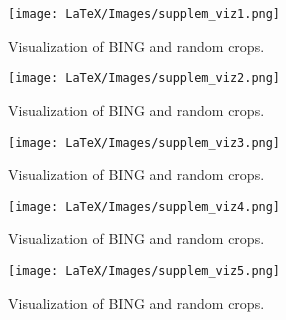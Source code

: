 \begin{figure*}[t!]

  \centering
   \centering
    \texttt{[image: LaTeX/Images/supplem\_viz1.png]}
   
    \caption{Visualization of BING and random crops. }
     \label{tab:viz_bing1}
\end{figure*}


\begin{figure*}[t!]

  \centering
   \centering
    \texttt{[image: LaTeX/Images/supplem\_viz2.png]}
   
    \caption{Visualization of BING and random crops.}
     \label{tab:viz_bing2}
\end{figure*}
\begin{figure*}[t!]

  \centering
   \centering
    \texttt{[image: LaTeX/Images/supplem\_viz3.png]}
   
    \caption{Visualization of BING and random crops.}
     \label{tab:viz_bing3}
\end{figure*}
\begin{figure*}[t!]

  \centering
   \centering
    \texttt{[image: LaTeX/Images/supplem\_viz4.png]}
   
    \caption{Visualization of BING and random crops.}
     \label{tab:viz_bing4}
\end{figure*}
\begin{figure*}[t!]

  \centering
   \centering
    \texttt{[image: LaTeX/Images/supplem\_viz5.png]}
   
    \caption{Visualization of BING and random crops.}
     \label{tab:viz_bing5}
\end{figure*}




